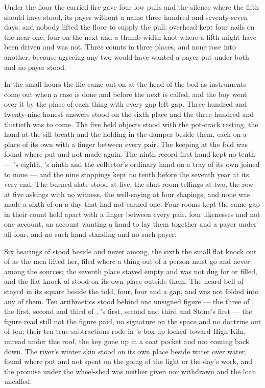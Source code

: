 Under the floor the carried fire gave four low pulls and the silence where the fifth should have stood, its payer without a name three hundred and seventy-seven days, and nobody lifted the floor to supply the pull; overhead  kept four nails on the near one, four on the next and a thumb-width knot where a fifth might have been driven and was not. Three counts in three places, and none rose into another, because agreeing any two would have wanted a payer put under both and no payer stood.

\scenebreak

In the small hours the file came out on  at the head of the bed as instruments come out when a case is done and before the next is called, and the boy went over it by the place of each thing with every gap left gap. Three hundred and twenty-nine honest answers stood on the sixth place and the three hundred and thirtieth was to come. The five held objects stood with the pot-crack resting, the hand-at-the-sill breath and the holding in the damper beside them, each on a place of its own with a finger between every pair. The keeping at the fold was found where put and not made again. The ninth record-first hand kept no tenth — 's eighth, 's ninth and the collector's ordinary hand on a tray of its own joined to none — and the nine stoppings kept no tenth before the seventh year at its very end. The burned slate stood at five, the shut-room tellings at two, the row at five askings with no witness, the well-saying at four shapings, and none was made a sixth of on a day that had not earned one. Four rooms kept the same gap in their count held apart with a finger between every pair, four likenesses and not one account, an account wanting a hand to lay them together and a payer under all four, and no such hand standing and no such payer.

Six hearings of  stood beside and never among, the sixth the small flat knock out of  as the men lifted her, filed where a thing out of a person must go and never among the sources; the seventh place stayed empty and was not dug for or filled, and the flat knock of  stood on its own place outside them. The heard bell of  stayed in its square beside the told, four, four and a gap, and was not folded into any of them. Ten arithmetics stood behind one unsigned figure — the three of , the first, second and third of , 's first, second and third and Stone's first — the figure read still not the figure paid, no signature on the space and no doctrine out of ten; their ten true subtractions rode in 's box up  locked toward High Kiln, unread under this roof, the key gone up in a coat pocket and not coming back down. The river's winter skin stood on its own place beside water over water, found where put and not spent on the going of the light or the day's work, and the promise under the wheel-shed was neither given nor withdrawn and the loan uncalled.

